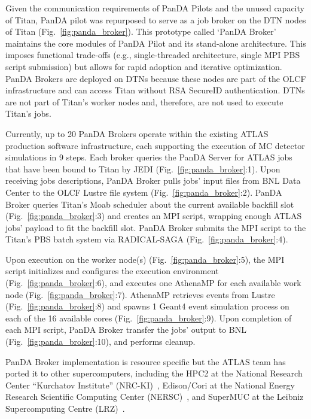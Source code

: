 Given the communication requirements of PanDA Pilots and the unused capacity
of Titan, PanDA pilot was repurposed to serve as a job broker on the DTN
nodes of Titan (Fig.~\ref{fig:panda_broker}). This prototype called `PanDA
Broker' maintains the core modules of PanDA Pilot and its stand-alone
architecture. This imposes functional trade-offs (e.g., single-threaded
architecture, single MPI PBS script submission) but allows for rapid adoption
and iterative optimization. PanDA Brokers are deployed on DTNs because these
nodes are part of the OLCF infrastructure and can access Titan without RSA
SecureID authentication. DTNs are not part of Titan's worker nodes and,
therefore, are not used to execute Titan's jobs.

Currently, up to 20 PanDA Brokers operate within the existing ATLAS
production software infrastructure, each supporting the execution of MC
detector simulations in 9 steps. Each broker queries the PanDA Server for
ATLAS jobs that have been bound to Titan by JEDI
(Fig.~\ref{fig:panda_broker}:1). Upon receiving jobs descriptions, PanDA
Broker pulls jobs' input files from BNL Data Center to the OLCF Lustre file
system (Fig.~\ref{fig:panda_broker}:2). PanDA Broker queries Titan's Moab
scheduler about the current available backfill slot
(Fig.~\ref{fig:panda_broker}:3) and creates an MPI script, wrapping enough
ATLAS jobs' payload to fit the backfill slot. PanDA Broker submits the MPI
script to the Titan's PBS batch system via RADICAL-SAGA
(Fig.~\ref{fig:panda_broker}:4).

Upon execution on the worker node(s) (Fig.~\ref{fig:panda_broker}:5), the MPI
script initializes and configures the execution environment
(Fig.~\ref{fig:panda_broker}:6), and executes one AthenaMP for each available
work node (Fig.~\ref{fig:panda_broker}:7). AthenaMP retrieves events from
Lustre (Fig.~\ref{fig:panda_broker}:8) and spawns 1 Geant4 event simulation
process on each of the 16 available cores (Fig.~\ref{fig:panda_broker}:9).
Upon completion of each MPI script, PanDA Broker transfer the jobs' output to
BNL (Fig.~\ref{fig:panda_broker}:10), and performs cleanup.

PanDA Broker implementation is resource specific but the ATLAS team has
ported it to other supercomputers, including the HPC2 at the National
Research Center ``Kurchatov Institute''
(NRC-KI)~\cite{belyaev2015integration}, Edison/Cori at the National Energy
Research Scientific Computing Center (NERSC)~\cite{barreiro2016panda}, and
SuperMUC at the Leibniz Supercomputing Centre (LRZ)~\cite{barreiro2016panda}.

